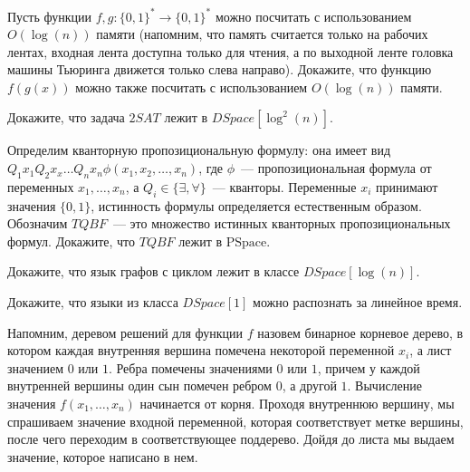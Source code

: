 \setcounter{curtask}{40}



\begin{task}
    Пусть функции $f, g: \{0, 1\}^* \rightarrow \{0, 1\}^*$ можно посчитать с
    использованием $O(\log(n))$ памяти (напомним, что память считается только на
    рабочих лентах, входная лента доступна только для чтения, а по выходной ленте
    головка машины Тьюринга движется только слева направо). Докажите, что функцию
    $f(g(x))$ можно также посчитать с использованием $O(\log(n))$ памяти.
\end{task}

\begin{task}
	Докажите, что задача $2SAT$ лежит в $DSpace[\log^2(n)]$.    
\end{task}

\begin{task}
	Определим кванторную пропозициональную формулу: она имеет вид \\
    $Q_1 x_1 Q_2 x_x
    \dots Q_n x_n \phi(x_1, x_2, \dots, x_n)$, где $\phi$~--- пропозициональная
    формула от переменных $x_1, \dots, x_n$, а $Q_i \in \{\exists, \forall\}$~---
    кванторы. Переменные $x_i$ принимают значения $\{0, 1\}$, истинность формулы
    определяется естественным образом. Обозначим $TQBF$~--- это множество истинных
    кванторных пропозициональных формул.
    Докажите, что $TQBF$ лежит в $\mathrm{PSpace}$.
\end{task}

\begin{task}
    Докажите, что язык графов с циклом лежит в классе $DSpace[\log(n)]$.
\end{task}

\begin{task}
    Докажите, что языки из класса $DSpace[1]$ можно распознать за линейное время.
\end{task}


Напомним, деревом решений для функции $f$ назовем бинарное корневое дерево, в котором
каждая внутренняя вершина помечена некоторой переменной $x_i$, а лист значением $0$
или $1$. Ребра помечены значениями $0$ или $1$, причем у каждой внутренней вершины
один сын помечен ребром $0$, а другой $1$. Вычисление значения $f(x_1, \dots, x_n)$
начинается от корня. Проходя внутреннюю вершину, мы спрашиваем значение входной
переменной, которая соответствует метке вершины, после чего переходим в
соответствующее поддерево. Дойдя до листа мы выдаем значение, которое написано в нем.

